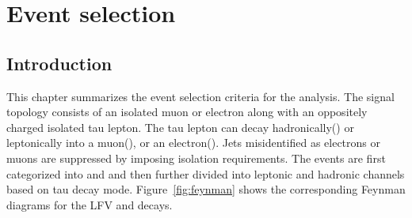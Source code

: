 %
%

\chapter{Event selection}
\label{event_sel}

\section{Introduction}
\label{evt_sel_intro}
This chapter summarizes the event selection criteria for the analysis. The signal topology consists of an isolated muon or electron along with an oppositely charged isolated tau lepton. The tau lepton can decay hadronically(\tauh) or leptonically into a muon(\taum), or an electron(\taue). Jets misidentified as electrons or muons are suppressed by imposing isolation requirements. The events are first categorized into \mutau and \etau and then further divided into leptonic and hadronic channels based on tau decay mode. Figure~\ref{fig:feynman} shows the corresponding Feynman diagrams for the LFV \Hmt and \Het decays.

